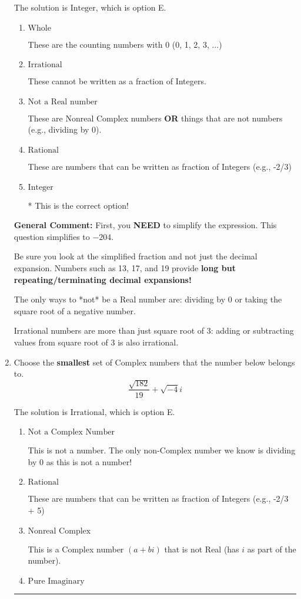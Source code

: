 \documentclass{extbook}[14pt]
\newcommand{\litem}[1]{\item #1

\rule{\textwidth}{0.4pt}}
\begin{document}
\begin{enumerate}
{The solution is \( \text{Integer} \), which is option E.\begin{enumerate}[label=\Alph*.]
\item \( \text{Whole} \)

These are the counting numbers with 0 (0, 1, 2, 3, ...)
\item \( \text{Irrational} \)

These cannot be written as a fraction of Integers.
\item \( \text{Not a Real number} \)

These are Nonreal Complex numbers \textbf{OR} things that are not numbers (e.g., dividing by 0).
\item \( \text{Rational} \)

These are numbers that can be written as fraction of Integers (e.g., -2/3)
\item \( \text{Integer} \)

* This is the correct option!
\end{enumerate}

\textbf{General Comment:} First, you \textbf{NEED} to simplify the expression. This question simplifies to $-204$. 
 
 Be sure you look at the simplified fraction and not just the decimal expansion. Numbers such as 13, 17, and 19 provide \textbf{long but repeating/terminating decimal expansions!} 
 
 The only ways to *not* be a Real number are: dividing by 0 or taking the square root of a negative number. 
 
 Irrational numbers are more than just square root of 3: adding or subtracting values from square root of 3 is also irrational.
}
\litem{
Choose the \textbf{smallest} set of Complex numbers that the number below belongs to.
\[ \frac{\sqrt{182}}{19}+\sqrt{-4}i \]

The solution is \( \text{Irrational} \), which is option E.\begin{enumerate}[label=\Alph*.]
\item \( \text{Not a Complex Number} \)

This is not a number. The only non-Complex number we know is dividing by 0 as this is not a number!
\item \( \text{Rational} \)

These are numbers that can be written as fraction of Integers (e.g., -2/3 + 5)
\item \( \text{Nonreal Complex} \)

This is a Complex number $(a+bi)$ that is not Real (has $i$ as part of the number).
\item \( \text{Pure Imaginary} \)


\end{enumerate}}
\end{enumerate}
\end{document}
